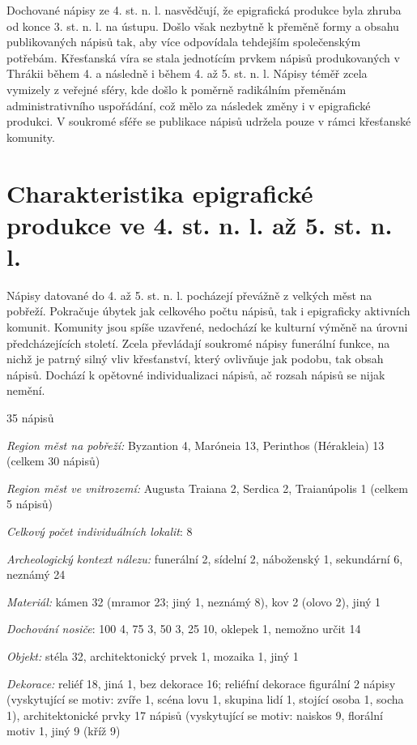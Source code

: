 Dochované nápisy ze 4. st. n. l. nasvědčují, že epigrafická produkce byla zhruba od konce 3. st. n. l. na ústupu. Došlo však nezbytně k přeměně formy a obsahu publikovaných nápisů tak, aby více odpovídala tehdejším společenským potřebám. Křesťanská víra se stala jednotícím prvkem nápisů produkovaných v Thrákii během 4. a následně i během 4. až 5. st. n. l. Nápisy téměř zcela vymizely z veřejné sféry, kde došlo k poměrně radikálním přeměnám administrativního uspořádání, což mělo za následek změny i v epigrafické produkci. V soukromé sféře se publikace nápisů udržela pouze v rámci křesťanské komunity.

\section[charakteristika-epigrafické-produkce-ve-4.-st.-n.-l.-až-5.-st.-n.-l.]{Charakteristika epigrafické produkce ve 4. st. n. l. až 5. st. n. l.}

Nápisy datované do 4. až 5. st. n. l. pocházejí převážně z velkých měst na pobřeží. Pokračuje úbytek jak celkového počtu nápisů, tak i epigraficky aktivních komunit. Komunity jsou spíše uzavřené, nedochází ke kulturní výměně na úrovni předcházejících století. Zcela převládají soukromé nápisy funerální funkce, na nichž je patrný silný vliv křesťanství, který ovlivňuje jak podobu, tak obsah nápisů. Dochází k opětovné individualizaci nápisů, ač rozsah nápisů se nijak nemění.

\placetable[none]{}
\starttable[|l|]
\HL
{} 35 nápisů

{\em Region měst na pobřeží:} Byzantion 4, Maróneia 13, Perinthos (Hérakleia) 13 (celkem 30 nápisů)

{\em Region měst ve vnitrozemí:} Augusta Traiana 2, Serdica 2, Traianúpolis 1 (celkem 5 nápisů)

{\em Celkový počet individuálních lokalit}: 8

{\em Archeologický kontext nálezu:} funerální 2, sídelní 2, náboženský 1, sekundární 6, neznámý 24

{\em Materiál:} kámen 32 (mramor 23; jiný 1, neznámý 8), kov 2 (olovo 2), jiný 1

{\em Dochování nosiče}: 100  4, 75  3, 50  3, 25  10, oklepek 1, nemožno určit 14

{\em Objekt:} stéla 32, architektonický prvek 1, mozaika 1, jiný 1

{\em Dekorace:} reliéf 18, jiná 1, bez dekorace 16; reliéfní dekorace figurální 2 nápisy (vyskytující se motiv: zvíře 1, scéna lovu 1, skupina lidí 1, stojící osoba 1, socha 1), architektonické prvky 17 nápisů (vyskytující se motiv: naiskos 9, florální motiv 1, jiný 9 (kříž 9)

